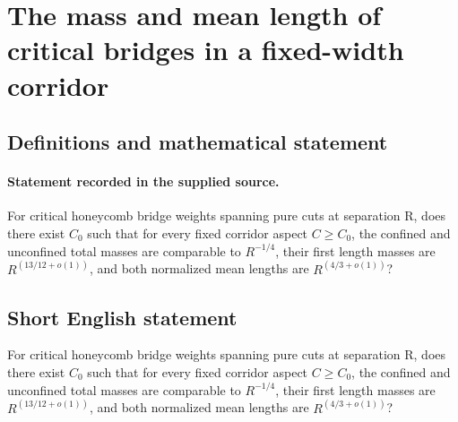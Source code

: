 \documentclass[11pt]{article}
\begin{document}
\section*{The mass and mean length of critical bridges in a fixed-width corridor}\label{statement}
\subsection{Definitions and mathematical statement}
\paragraph{Statement recorded in the supplied source.}
For critical honeycomb bridge weights spanning pure cuts at separation R, does there exist $C_0$ such that for every fixed corridor aspect $C\geq C_0$, the confined and unconfined total masses are comparable to $R^{-1/4}$, their first length masses are $R^(13/12+o(1))$, and both normalized mean lengths are $R^(4/3+o(1))$?
\subsection{Short English statement}
For critical honeycomb bridge weights spanning pure cuts at separation R, does there exist $C_0$ such that for every fixed corridor aspect $C\geq C_0$, the confined and unconfined total masses are comparable to $R^{-1/4}$, their first length masses are $R^(13/12+o(1))$, and both normalized mean lengths are $R^(4/3+o(1))$?
\end{document}
